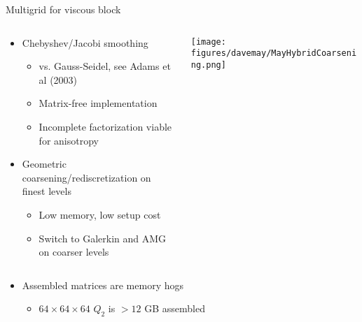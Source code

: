 \documentclass{beamer}
\begin{document}
\begin{frame}{Multigrid for viscous block}
  \begin{columns}
    \begin{column}{0.5\textwidth}
      \begin{itemize}
    \item Chebyshev/Jacobi smoothing
      \begin{itemize}
      \item vs. Gauss-Seidel, see Adams et al (2003)
      \item Matrix-free implementation
      \item Incomplete factorization viable for anisotropy
      \end{itemize}
    \item Geometric coarsening/rediscretization on finest levels
      \begin{itemize}
      \item Low memory, low setup cost
      \item Switch to Galerkin and AMG on coarser levels
      \end{itemize}
    \end{itemize}
  \end{column}
  \begin{column}{0.5\textwidth}
    \texttt{[image: figures/davemay/MayHybridCoarsening.png]} \\
  \end{column}
  \end{columns}
  \begin{itemize}
  \item Assembled matrices are memory hogs
    \begin{itemize}
    \item $64\times 64\times 64$ $Q_2$ is $> 12$ GB assembled
    \end{itemize}
  \end{itemize}
\end{frame}


\end{document}
